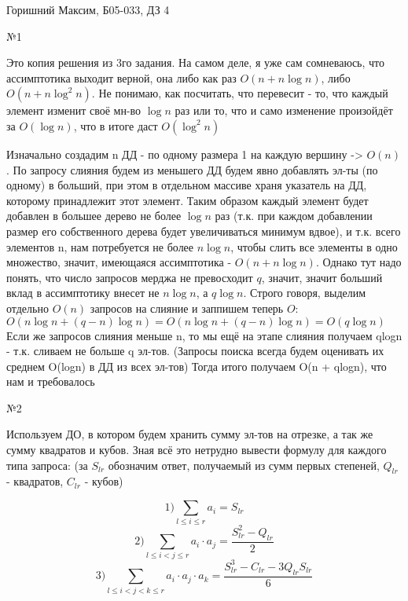 \documentclass{article}
\begin{document}
\large

\begin{flushleft}
Горишний Максим, Б05-033, ДЗ 4
\end{flushleft}

\begin{center}
\huge №1
\end{center}

Это копия решения из 3го задания. На самом деле, я уже сам сомневаюсь, что ассимптотика выходит верной, она либо как раз $O(n + n\log n)$, либо $O(n + n \log^2n)$. Не понимаю, как посчитать, что перевесит - то, что каждый элемент изменит своё мн-во $\log n$ раз или то, что и само изменение произойдёт за $O(\log n)$, что в итоге даст $O(\log^2n)$

Изначально создадим n ДД - по одному размера 1 на каждую вершину -> $O(n)$. По запросу слияния будем из меньшего ДД будем явно добавлять эл-ты (по одному) в больший, при этом в отдельном массиве храня указатель на ДД, которому принадлежит этот элемент. Таким образом каждый элемент будет добавлен в большее дерево не более $\log n$ раз (т.к. при каждом добавлении размер его собственного дерева будет увеличиваться минимум вдвое), и т.к. всего элементов n, нам потребуется не более $n\log n$, чтобы слить все элементы в одно множество, значит, имеющаяся ассимптотика - $O(n + n\log n)$. Однако тут надо понять, что число запросов мерджа не превосходит $q$, значит, значит больший вклад в ассимптотику внесет не $n\log n$, а $q\log n$. Строго говоря, выделим отдельно $O(n)$ запросов на слияние и заппишем теперь $O$:
$O(n\log n + (q - n)\log n) = O(n\log n + (q - n)\log n) = O(q\log n)$
Если же запросов слияния меньше n, то мы ещё на этапе слияния получаем qlogn - т.к. сливаем не больше q эл-тов.
(Запросы поиска всегда будем оценивать их среднем O(logn) в ДД из всех эл-тов)
Тогда итого получаем O(n + qlogn), что нам и требовалось

\begin{center}
\huge №2
\end{center}

Используем ДО, в котором будем хранить сумму эл-тов на отрезке, а так же сумму квадратов и кубов. Зная всё это нетрудно вывести формулу для каждого типа запроса: (за $S_{lr}$ обозначим ответ, получаемый из сумм первых степеней, $Q_{lr}$ - квадратов, $C_{lr}$ - кубов)

$$ 1) \sum_{l \leq i \leq r} a_i =  S_{lr} $$
$$ 2) \sum_{l \leq i < j \leq r} a_i \cdot a_j =  \frac{S_{lr}^2 - Q_{lr}}{2} $$
$$ 3) \sum_{l \leq i < j < k \leq r} a_i \cdot a_j \cdot a_k =  \frac{S_{lr}^3 - C_{lr} - 3 Q_{lr}S_{lr}}{6} $$
\end{document}

